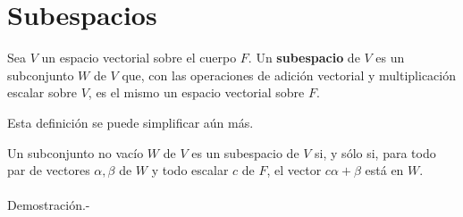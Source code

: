 \section{Subespacios}

\begin{def.}
    Sea $V$ un espacio vectorial sobre el cuerpo $F$. Un \textbf{subespacio} de $V$ es un subconjunto $W$ de $V$ que, con las operaciones de adición vectorial y multiplicación escalar sobre $V$, es el mismo un espacio vectorial sobre $F$.
\end{def.}

Esta definición se puede simplificar aún más.

\begin{teo}
    Un subconjunto no vacío $W$ de $V$ es un subespacio de $V$ si, y sólo si, para todo par de vectores $\alpha,\beta$ de $W$ y todo escalar $c$ de $F$, el vector $c\alpha+\beta$ está en $W$.\\\\
	Demostración.-\;
\end{teo}

